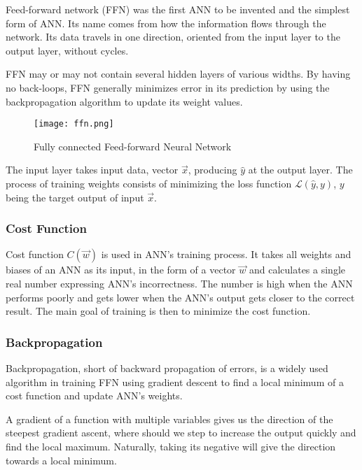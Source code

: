Feed-forward network (FFN) was the first ANN to be invented and the simplest form of ANN. Its name comes from how the information flows through the network. Its data travels in one direction, oriented from the input layer to the output layer, without cycles.\cite{ffnbrilliant} 

FFN may or may not contain several hidden layers of various widths. By having no back-loops, FFN generally minimizes error in its prediction by using the backpropagation algorithm to update its weight values.\cite{mainTypesANN}

\begin{figure}[h]
	\centering
    \texttt{[image: ffn.png]}
	\caption{Fully connected Feed-forward Neural Network \cite{matous}}
	\label{fig:ffn}
\end{figure}

The input layer takes input data, vector $\vec{x}$, producing $\hat{y}$ at the output layer. The process of training weights
 consists of minimizing the loss function $\mathcal{L}(\hat{y},y)$, $y$ being the target output of input $\vec{x}$.\cite{lipton2015critical}


\subsubsection{Cost Function}
Cost function $C(\vec{w})$ is used in ANN's training process. It takes all weights and biases of an ANN as its input, in the form of a vector $\vec{w}$ and calculates a single real number expressing ANN's incorrectness.\cite{Goodfellow-et-al-2016} The number is high when the ANN performs poorly and gets lower when the ANN's output gets closer to the correct result. The main goal of training is then to minimize the cost function. 

\subsubsection{Backpropagation}
Backpropagation, short of backward propagation of errors, is a widely used algorithm in training FFN using gradient descent to find a local minimum of a cost function and update ANN's weights.\cite{birlliantbackprop}

A gradient of a function with multiple variables gives us the direction of the steepest gradient ascent, where should we step to increase the output quickly and find the local maximum. Naturally, taking its negative will give the direction towards a local minimum. 

